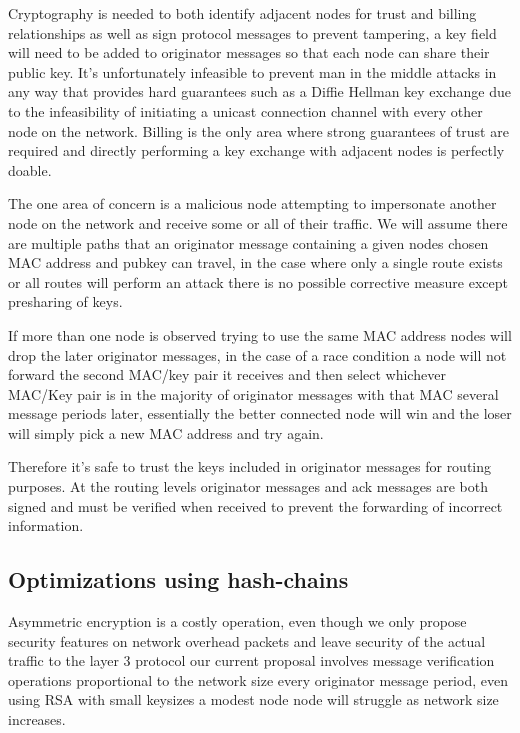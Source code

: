 \documentclass[11pt]{article}
\begin{document}
               Cryptography is needed to both identify adjacent nodes for trust and billing relationships as well as sign protocol messages to prevent tampering, a key field will need to be added to originator messages so that each node can share their public key. It's unfortunately infeasible to prevent man in the middle attacks in any way that provides hard guarantees such as a Diffie Hellman key exchange due to the infeasibility of initiating a unicast connection channel with every other node on the network. Billing is the only area where strong guarantees of trust are required and directly performing a key exchange with adjacent nodes is perfectly doable.
               
               The one area of concern is a malicious node attempting to impersonate another node on the network and receive some or all of their traffic. We will assume there are multiple paths that an originator message containing a given nodes chosen MAC address and pubkey can travel, in the case where only a single route exists or all routes will perform an attack there is no possible corrective measure except presharing of keys. 
               
               If more than one node is observed trying to use the same MAC address nodes will drop the later originator messages, in the case of a race condition a node will not forward the second MAC/key pair it receives and then select whichever MAC/Key pair is in the majority of originator messages with that MAC several message periods later, essentially the better connected node will win and the loser will simply pick a new MAC address and try again.
               
               Therefore it's safe to trust the keys included in originator messages for routing purposes. At the routing levels originator messages and ack messages are both signed and must be verified when received to prevent the forwarding of incorrect information.  
                   
    \subsection{Optimizations using hash-chains} \label{crypto}
    
               Asymmetric encryption is a costly operation, even though we only propose security features on network overhead packets and leave security of the actual traffic to the layer 3 protocol our current proposal involves message verification operations proportional to the network size every originator message period, even using RSA with small keysizes a modest node node will struggle as network size increases.
               
\end{document}
